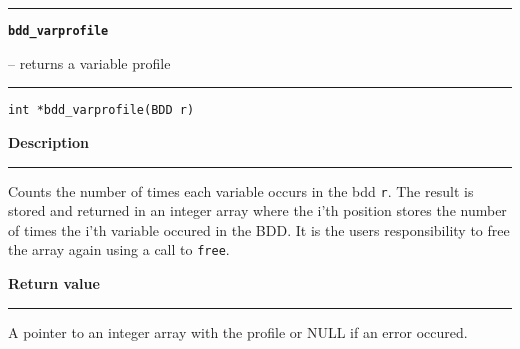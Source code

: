 \begin{minipage}{\textwidth}

\noindent\begin{minipage}{\textwidth}
\rule{\textwidth}{0.5mm}
{\tt\bf bdd\_varprofile }
\--- returns a variable profile  \hspace{\fill}
\\\rule[1.5ex]{\textwidth}{0.5mm}
\end{minipage}

\noindent\begin{verbatim}
int *bdd_varprofile(BDD r) 
\end{verbatim}

\vspace{\parsep}\noindent
{\bf Description}\\\rule[1.5ex]{\textwidth}{0.2mm}\vspace{-1.5ex}\setlength{\parindent}{1em}
Counts the number of times each variable occurs in the
           bdd {\tt r}. The result is stored and returned in an integer array
	   where the i'th position stores the number of times the i'th
	   variable occured in the BDD. It is the users responsibility to
	   free the array again using a call to {\tt free}. 

\setlength{\parindent}{0em}\vspace{\parsep}\vspace{\baselineskip}\noindent
{\bf Return value}\\\rule[1.5ex]{\textwidth}{0.2mm}\vspace{-1.5ex}
A pointer to an integer array with the profile or NULL if an
           error occured. 
\end{minipage}
\vspace{8ex}
